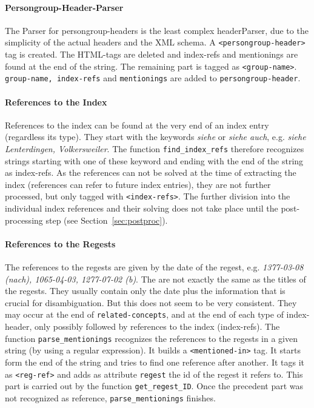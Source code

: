 \paragraph{Persongroup-Header-Parser}
The Parser for persongroup-headers is the least complex headerParser, due to the simplicity of the actual headers and the XML schema. A \texttt{<persongroup-header>} tag is created. The HTML-tags are deleted and index-refs and mentionings are found at the end of the string. The remaining part is tagged as \texttt{<group-name>}. \texttt{group-name, index-refs} and \texttt{mentionings} are added to \texttt{persongroup-header}.

\paragraph{References to the Index}
\label{sec:index-refs}
References to the index can be found at the very end of an index entry (regardless its type). They start with the keywords \textit{siehe} or \textit{siehe auch}, e.g. \textit{siehe Lenterdingen, Volkersweiler}. The function \texttt{find\_index\_refs} therefore recognizes strings starting with one of these keyword and ending with the end of the string as index-refs. As the references can not be solved at the time of extracting the index (references can refer to future index entries), they are not further processed, but only tagged with \texttt{<index-refs>}. The further division into the individual index references and their solving does not take place until the post-processing step (see Section~\ref{sec:postproc}).

\paragraph{References to the Regests}
\label{sec:reg-refs}
The references to the regests are given by the date of the regest, e.g. \textit{1377-03-08 (nach), 1065-04-03, 1277-07-02 (b)}. The are not exactly the same as the titles of the regests. They usually contain only the date plus the information that is crucial for disambiguation. But this does not seem to be very consistent. They may occur at the end of \texttt{related-concepts}, and at the end of each type of index-header, only possibly followed by references to the index (index-refs).
The function \texttt{parse\_mentionings} recognizes the references to the regests in a given string (by using a regular expression). It builds a \texttt{<mentioned-in>} tag. It starts form the end of the string and tries to find one reference after another. It tags it as \texttt{<reg-ref>} and adds as attribute \texttt{regest} the id of the regest it refers to. This part is carried out by the function \texttt{get\_regest\_ID}. Once the precedent part was not recognized as reference, \texttt{parse\_mentionings} finishes.


